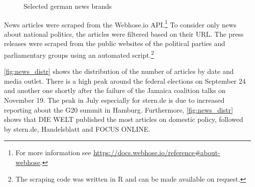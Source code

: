 \documentclass[
  12pt,
]{article}
\begin{document}
\begin{figure}

{\centering {}

}

\caption{Selected german news brands \label{fig:news_market}}\label{fig:unnamed-chunk-1}
\end{figure}

News articles were scraped from the Webhose.io API.\footnote{For more
  information see
  \url{https://docs.webhose.io/reference\#about-webhose}.} To consider
only news about national politics, the articles were filtered based on
their URL. The press releases were scraped from the public websites of
the political parties and parliamentary groups using an automated
script.\footnote{The scraping code was written in R and can be made
  available on request.}

\autoref{fig:news_distr} shows the distribution of the number of
articles by date and media outlet. There is a high peak around the
federal elections on September 24 and another one shortly after the
failure of the Jamaica coalition talks on November 19. The peak in July
especially for stern.de is due to increased reporting about the G20
summit in Hamburg. Furthermore, \autoref{fig:news_distr} shows that DIE
WELT published the most articles on domestic policy, followed by
stern.de, Handelsblatt and FOCUS ONLINE.
\end{document}
